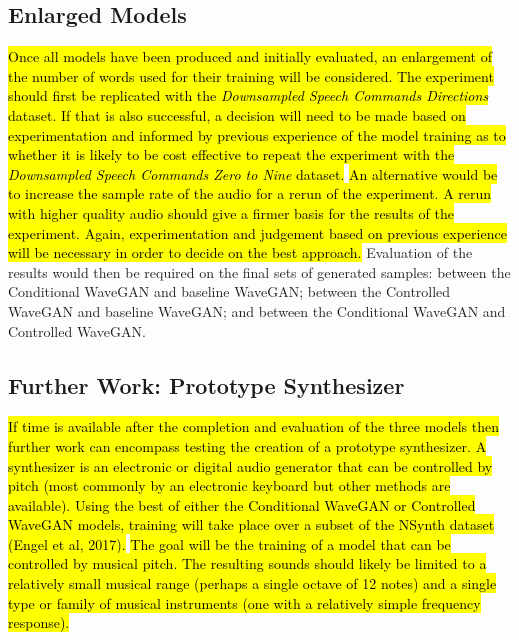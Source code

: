 \documentclass[titlepage]{article}
\begin{document}
\subsection{Enlarged Models}

\hl{
Once all models have been produced and initially evaluated, an enlargement of the number of words used for their training will be considered.
The experiment should first be replicated with the \textit{Downsampled Speech Commands Directions} dataset.
If that is also successful, a decision will need to be made based on experimentation and informed by previous experience of the model training as to whether it is likely to be cost effective to repeat the experiment with the \textit{Downsampled Speech Commands Zero to Nine} dataset.
}
\newline
\newline
{}
\hl{
An alternative would be to increase the sample rate of the audio for a rerun of the experiment.
A rerun with higher quality audio should give a firmer basis for the results of the experiment.
Again, experimentation and judgement based on previous experience will be necessary in order to decide on the best approach.
}
\newline
\newline
Evaluation of the results would then be required on the final sets of generated samples: between the Conditional WaveGAN and baseline WaveGAN; between the Controlled WaveGAN and baseline WaveGAN; and between the Conditional WaveGAN and Controlled WaveGAN.

\subsection{Further Work: Prototype Synthesizer}

\hl{
If time is available after the completion and evaluation of the three models then further work can encompass testing the creation of a prototype synthesizer.
A synthesizer is an electronic or digital audio generator that can be controlled by pitch (most commonly by an electronic keyboard but other methods are available).
Using the best of either the Conditional WaveGAN or Controlled WaveGAN models, training will take place over a subset of the NSynth dataset (Engel et al, 2017).
}
\newline
\newline
\hl{
The goal will be the training of a model that can be controlled by musical pitch.
The resulting sounds should likely be limited to a relatively small musical range (perhaps a single octave of 12 notes) and a single type or family of musical instruments (one with a relatively simple frequency response).
}
\end{document}

